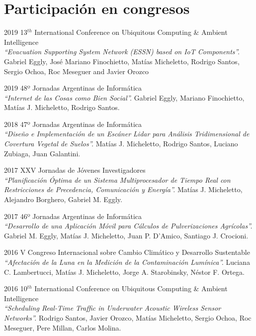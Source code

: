 \documentclass[letterpaper]{twentysecondcv} %
\begin{document}
\section{Participación en congresos}

\begin{twenty}
\twentyitem
    {2019}
    {}
    {13$^{th}$ International Conference on Ubiquitous Computing \& Ambient Intelligence\\} 
    {\textit{``Evacuation Supporting System Network (ESSN) based on IoT Components''.}}
    {Gabriel Eggly, José Mariano Finochietto, Matías Micheletto, Rodrigo Santos, Sergio Ochoa, Roc Meseguer and Javier Orozco}

\twentyitem
    {2019}
    {}
    {48º Jornadas Argentinas de Informática\\} 
    {\textit{``Internet de las Cosas como Bien Social''.}}
    {Gabriel Eggly, Mariano Finochietto, Matías J. Micheletto, Rodrigo Santos.}
    
\twentyitem
    {2018}
    {}
    {47º Jornadas Argentinas de Informática\\}
    {\textit{``Diseño e Implementación de un Escáner Lidar para Análisis Tridimensional de Covertura Vegetal de Suelos''.}}
    {Matías J. Micheletto, Rodrigo Santos, Luciano Zubiaga, Juan Galantini.}

\twentyitem
    {2017}
    {}
    {XXV Jornadas de Jóvenes Investigadores\\}
    {\textit{``Planificación Óptima de un Sistema Multiprocesador de Tiempo Real con Restricciones de Precedencia, Comunicación y Energía''.}}
    {Matías J. Micheletto, Alejandro Borghero, Gabriel M. Eggly.}
    
\twentyitem
    {2017}
    {}
    {46º Jornadas Argentinas de Informática\\}
    {\textit{``Desarrollo de una Aplicación Móvil para Cálculos de Pulverizaciones Agrícolas''.}}
    {Gabriel M. Eggly, Matías J. Micheletto, Juan P. D'Amico, Santiago J. Crocioni.}
    
\twentyitem
    {2016}
    {}
    {V Congreso Internacional sobre Cambio Climático y Desarrollo Sustentable\\}
    {\textit{``Afectación de la Luna en la Medición de la Contaminación Lumínica''.}}
    {Luciana C. Lambertucci, Matías J. Micheletto, Jorge A. Starobinsky, Néstor F. Ortega.}
    
\twentyitem
    {2016}
    {}
    {10$^{th}$ International Conference on Ubiquitous Computing \& Ambient Intelligence\\}
    {\textit{``Scheduling Real-Time Traffic in Underwater Acoustic Wireless Sensor Networks''.}}
    {Rodrigo Santos, Javier Orozco, Matías Micheletto, Sergio Ochoa, Roc Meseguer, Pere Millan, Carlos Molina.}
    

\end{twenty}
\end{document}
